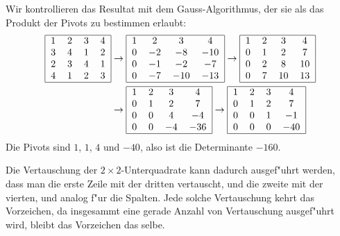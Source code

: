 {\begin{loesung}
\begin{teilaufgaben}
Wir kontrollieren das Resultat mit dem Gauss-Algorithmus, der
sie als das Produkt der Pivots zu bestimmen erlaubt:
\begin{align*}
\begin{tabular}{|cccc|}
\hline
1&2&3&4\\
3&4&1&2\\
2&3&4&1\\
4&1&2&3\\
\hline
\end{tabular}
&
\rightarrow
\begin{tabular}{|cccc|}
\hline
1&2&3&4\\
0&$-2$&$-8$&$-10$\\
0&$-1$&$-2$&$-7$\\
0&$-7$&$-10$&$-13$\\
\hline
\end{tabular}
\rightarrow
\begin{tabular}{|cccc|}
\hline
1&2&3&4\\
0&$1$&$2$&$7$\\
0&$2$&$8$&$10$\\
0&$7$&$10$&$13$\\
\hline
\end{tabular}
\\
&
\rightarrow
\begin{tabular}{|cccc|}
\hline
1&2&3&4\\
0&$1$&$2$&$7$\\
0&$0$&$4$&$-4$\\
0&$0$&$-4$&$-36$\\
\hline
\end{tabular}
\rightarrow
\begin{tabular}{|cccc|}
\hline
1&2&3&4\\
0&$1$&$2$&$7$\\
0&$0$&$1$&$-1$\\
0&$0$&$0$&$-40$\\
\hline
\end{tabular}
\end{align*}
Die Pivots sind $1$, $1$, $4$ und $-40$, also ist die Determinante $-160$.

\item Die Vertauschung der $2\times 2$-Unterquadrate kann dadurch
ausgef"uhrt werden, dass man die erste Zeile mit der dritten vertauscht,
und die zweite mit der vierten, und analog f"ur die Spalten. Jede
solche Vertauschung kehrt das Vorzeichen, da insgesammt eine gerade
Anzahl von Vertauschung ausgef"uhrt wird, bleibt das Vorzeichen das
selbe.
\end{teilaufgaben}
\end{loesung}
}{}


